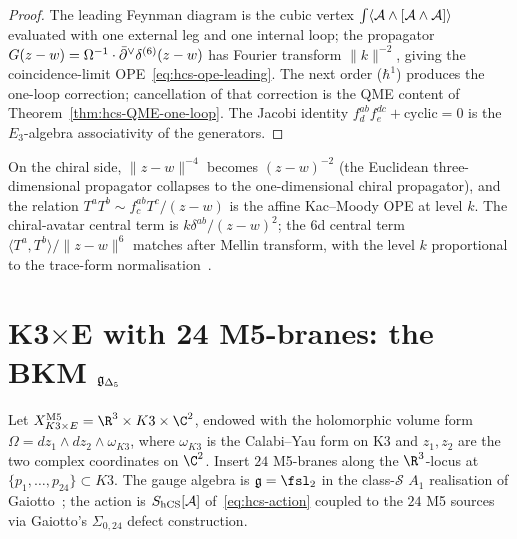 \begin{proof}
The leading Feynman diagram is the cubic vertex
$\int\langle\mathcal{A}\wedge[\mathcal{A}\wedge\mathcal{A}]\rangle$ evaluated with one external
leg and one internal loop; the propagator
$G(z-w) = \Omega^{-1}\cdot\bar\partial^\vee\delta^{(6)}(z-w)$ has Fourier
transform $\|k\|^{-2}$, giving the coincidence-limit
OPE~\eqref{eq:hcs-ope-leading}. The next order ($\hbar^1$) produces
the one-loop correction; cancellation of that correction is the QME
content of Theorem~\ref{thm:hcs-QME-one-loop}. The Jacobi
identity $f^{ab}_df^{dc}_e + \text{cyclic} = 0$ is the $E_3$-algebra
associativity of the generators.
\end{proof}

\begin{remark}
\label{rem:chiral-avatar-ope}
On the chiral side, $\|z-w\|^{-4}$ becomes $(z-w)^{-2}$ (the
Euclidean three-dimensional propagator collapses to the
one-dimensional chiral propagator), and the relation
$T^aT^b\sim f^{ab}_cT^c/(z-w)$ is the affine Kac--Moody OPE at level
$k$. The chiral-avatar central term is $k\delta^{ab}/(z-w)^2$;
the 6d central term $\langle T^a,T^b\rangle/\|z-w\|^6$ matches after
Mellin transform, with the level $k$ proportional to the trace-form
normalisation~\cite{CostelloYangian}.
\end{remark}

\section{K3$\times$E with 24 M5-branes: the BKM $\mathfrak{g}_{\Delta_5}$}
\label{sec:hcs-k3xE-bkm}

\begin{definition}
\label{def:hcs-k3xE}
%
Let
$X_{K3\times E}^{\mathrm{M5}} = \R^3\times K3\times\C^2$, endowed with
the holomorphic volume form
$\Omega = dz_1\wedge dz_2\wedge\omega_{K3}$, where $\omega_{K3}$ is the
Calabi--Yau form on K3 and $z_1,z_2$ are the two complex coordinates
on $\C^2$. Insert $24$ M5-branes along the $\R^3$-locus at
$\{p_1,\ldots,p_{24}\}\subset K3$. The gauge algebra is
$\fg = \fsl_2$ in the class-$\mathcal S$ $A_1$ realisation of
Gaiotto~\cite{Gaiotto2009}; the action is
$S_{\mathrm{hCS}}[\mathcal{A}]$ of~\eqref{eq:hcs-action} coupled to the $24$ M5
sources via Gaiotto's $\Sigma_{0,24}$ defect construction.
\end{definition}

